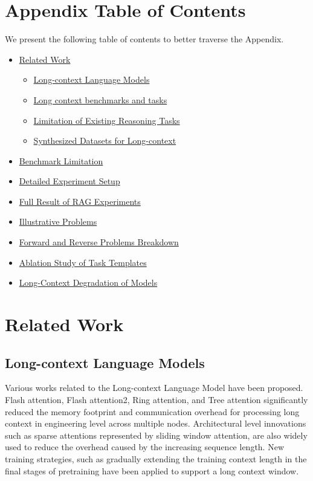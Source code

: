 \appendix 
\section*{Appendix Table of Contents}
We present the following table of contents to better traverse the Appendix. 

\begin{itemize}
    \item \hyperref[extrelatedworks]{Related Work}
    \begin{itemize}
        \item \hyperref[longcontextmodels]{Long-context Language Models}
        \item \hyperref[longcontextbenchmarks]{Long context benchmarks and tasks}
        \item \hyperref[reasoninglimitations]{Limitation of Existing Reasoning Tasks}
        \item \hyperref[synthesizeddatasets]{Synthesized Datasets for Long-context}
    \end{itemize} 
    \item \hyperref[limitation]{Benchmark Limitation} 
    \item \hyperref[setupr]{Detailed Experiment Setup}
    \item \hyperref[rag_full_result]{Full Result of RAG Experiments}
    \item \hyperref[illustrative_problems]{Illustrative Problems}
    \item \hyperref[forwardreverse]{Forward and Reverse Problems Breakdown}
    \item \hyperref[templates]{Ablation Study of Task Templates}
    \item \hyperref[picutrall]{Long-Context Degradation of Models}
\end{itemize} 

\section{Related Work} 
\label{extrelatedworks} 
\subsection{Long-context Language Models} 
\label{longcontextmodels} 
Various works related to the Long-context Language Model have been proposed. Flash attention\citep{dao2022flashattention}, Flash attention2\citep{dao2023flashattention2}, Ring attention\citep{liu2023ringattentionblockwisetransformers}, and Tree attention\citep{shyam2024treeattentiontopologyawaredecoding} significantly reduced the memory footprint and communication overhead for processing long context in engineering level across multiple nodes. Architectural level innovations such as sparse attentions represented by sliding window attention\citep{beltagy2020longformerlongdocumenttransformer}, are also widely used to reduce the overhead caused by the increasing sequence length. New training strategies, such as gradually extending the training context length in the final stages of pretraining have been applied to support a long context window\citep{dubey2024llama3herdmodels}.
